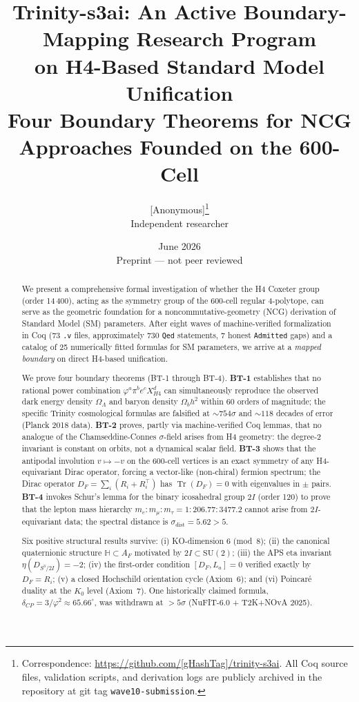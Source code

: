 \documentclass[12pt,a4paper]{article}
\title{\textbf{Trinity-s3ai: An Active Boundary-Mapping Research Program\\
on H4-Based Standard Model Unification}\\[0.5em]
{\normalsize Four Boundary Theorems for NCG Approaches Founded on the 600-Cell}}
\author{[Anonymous]\thanks{Correspondence: \url{https://github.com/[gHashTag]/trinity-s3ai}.
  All Coq source files, validation scripts, and derivation logs are publicly archived in the
  repository at git tag \texttt{wave10-submission}.}\\[0.3em]
\small Independent researcher}
\date{June 2026\\[0.2em]
\small Preprint — not peer reviewed}
\newcommand{\AF}{A_F}
\newcommand{\TwoI}{2I}
\newcommand{\BT}[1]{\textbf{BT-#1}}
\newcommand{\sigdist}{\sigma_{\mathrm{dist}}}
\begin{document}
\maketitle

\begin{abstract}
We present a comprehensive formal investigation of whether the H4 Coxeter group (order 14\,400),
acting as the symmetry group of the 600-cell regular 4-polytope, can serve as the geometric
foundation for a noncommutative-geometry (NCG) derivation of Standard Model (SM) parameters.
After eight waves of machine-verified formalization in Coq (73 \texttt{.v} files, approximately
730 \texttt{Qed} statements, 7 honest \texttt{Admitted} gaps) and a catalog of 25 numerically
fitted formulas for SM parameters, we arrive at a \emph{mapped boundary} on direct H4-based unification.

We prove four boundary theorems (BT-1 through BT-4).
\BT{1} establishes that no rational power combination
\(\varphi^a \pi^b e^c X_{H4}^d\) can simultaneously reproduce the observed dark energy density
\(\Omega_\Lambda\) and baryon density \(\Omega_b h^2\) within 60 orders of magnitude;
the specific Trinity cosmological formulas are falsified at \({\sim}754\sigma\) and
\({\sim}118\) decades of error (Planck 2018 data).
\BT{2} proves, partly via machine-verified Coq lemmas, that no analogue of the
Chamseddine-Connes \(\sigma\)-field arises from H4 geometry: the degree-2 invariant is
constant on orbits, not a dynamical scalar field.
\BT{3} shows that the antipodal involution \(v \mapsto -v\) on the 600-cell vertices
is an exact symmetry of any H4-equivariant Dirac operator, forcing a vector-like
(non-chiral) fermion spectrum; the Dirac operator \(D_F = \sum_i (R_i + R_i^\top)\)
has \(\operatorname{Tr}(D_F) = 0\) with eigenvalues in \(\pm\) pairs.
\BT{4} invokes Schur's lemma for the binary icosahedral group \(\TwoI\)
(order 120) to prove that the lepton mass hierarchy \(m_e : m_\mu : m_\tau = 1 : 206.77 : 3477.2\)
cannot arise from \(\TwoI\)-equivariant data; the spectral distance is \(\sigdist = 5.62 > 5\).

Six positive structural results survive: (i) KO-dimension 6 (mod~8); (ii) the canonical
quaternionic structure \(\mathbb{H} \subset \AF\) motivated by \(\TwoI \subset \mathrm{SU}(2)\);
(iii) the APS eta invariant \(\eta(D_{S^3/\TwoI}) = -2\); (iv) the first-order condition
\([D_F, L_a] = 0\) verified exactly by \(D_F = R_i\); (v) a closed Hochschild orientation cycle
(Axiom~6); and (vi) Poincar\'e duality at the \(K_0\) level (Axiom~7).
One historically claimed formula, \(\delta_{CP} = 3/\varphi^2 \approx 65.66^\circ\), was withdrawn at ${>}5\sigma$ (NuFIT-6.0 + T2K+NOvA 2025).
\end{abstract}
\end{document}
